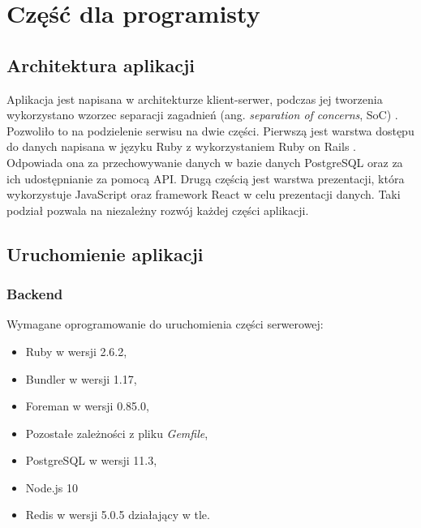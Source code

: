 \documentclass[declaration,shortabstract,polish,inz]{iithesis}
\begin{document}
\chapter{Część dla programisty}
\section{Architektura aplikacji}
Aplikacja jest napisana w architekturze klient-serwer, podczas jej tworzenia wykorzystano wzorzec separacji zagadnień (ang. \textit{separation of concerns}, SoC) \cite{soc}. Pozwoliło to na podzielenie serwisu na dwie części. Pierwszą jest warstwa dostępu do danych napisana w języku Ruby \cite{ruby} z wykorzystaniem Ruby on Rails \cite{ror}. Odpowiada ona za przechowywanie danych w bazie danych PostgreSQL \cite{postgre} oraz za ich udostępnianie za pomocą API. Drugą częścią jest warstwa prezentacji, która wykorzystuje JavaScript oraz framework React \cite{react} w celu prezentacji danych. Taki podział pozwala na niezależny rozwój każdej części aplikacji.

\section{Uruchomienie aplikacji}

\subsection{Backend}
Wymagane oprogramowanie do uruchomienia części serwerowej:
        \begin{itemize}
            \item Ruby w wersji 2.6.2,
            \item Bundler \cite{bundler} w wersji 1.17,
            \item Foreman \cite{foreman} w wersji 0.85.0,
            \item Pozostałe zależności z pliku \textit{Gemfile},
            \item PostgreSQL w wersji 11.3,
            \item Node.js 10
            \item Redis \cite{redis} w wersji 5.0.5 działający w tle.
        \end{itemize}
\end{document}
